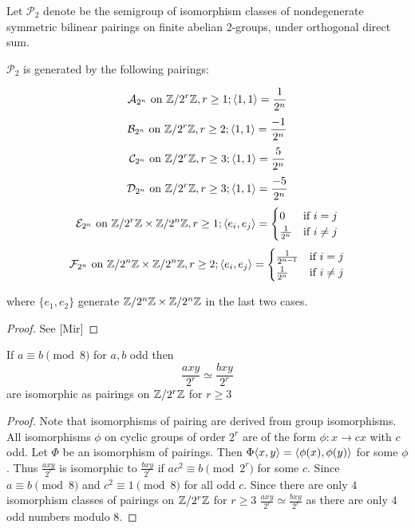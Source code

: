 \documentclass{amsart}
\begin{document}
\begin{defn}
 Let $\mathcal{P}_{2}$ denote be the semigroup of
isomorphism classes of nondegenerate symmetric bilinear pairings on
finite abelian 2-groups, under orthogonal direct sum.
\end{defn}

\begin{prop} $\mathcal{P}_{2}$ is generated by the following pairings:
  
   \[ \mathcal{A}_{2^{n}} \text{ on } \mathbb{Z}/2^{r}\mathbb{Z}, r\ge 1; \langle 1,
1\rangle=\frac{1}{2^{n}}
   \]
   \[ \mathcal{B}_{2^{n}} \text{ on } \mathbb{Z}/2^{r}\mathbb{Z}, r\ge 2; \langle 1,
1\rangle=\frac{-1}{2^{n}}
   \]
   \[ \mathcal{C}_{2^{n}} \text{ on } \mathbb{Z}/2^{r}\mathbb{Z}, r\ge 3; \langle 1,
1\rangle=\frac{5}{2^{n}}
   \]
   \[ \mathcal{D}_{2^{n}} \text{ on } \mathbb{Z}/2^{r}\mathbb{Z}, r\ge 3; \langle 1,
1\rangle=\frac{-5}{2^{n}}
   \]
   \[ \mathcal{E}_{2^{n}} \text{ on } \mathbb{Z}/2^{r}\mathbb{Z}\times\mathbb{Z}/2^{n}\mathbb{Z}, r\ge 1; \langle
e_{i}, e_{j}\rangle=\begin{cases}0&\mbox{if } i=j\\
\frac{1}{2^{n}}&\mbox{if } i\neq j\end{cases}
   \]
   \[ \mathcal{F}_{2^{n}} \text{ on } \mathbb{Z}/2^{n}\mathbb{Z}\times\mathbb{Z}/2^{n}\mathbb{Z}, r\ge 2; \langle
e_{i}, e_{j}\rangle=\begin{cases}\frac{1}{2^{n-1}}&\mbox{if } i=j\\
\frac{1}{2^{n}}&\mbox{if } i\neq j\end{cases}
   \]
   
where $\{e_{1}, e_{2}\}$ generate $\mathbb{Z}/2^{n}\mathbb{Z}\times\mathbb{Z}/2^{n}\mathbb{Z}$ in the
last two cases.
 \end{prop}
 \begin{proof} See [Mir]
 \end{proof}

\begin{lem}
 \label{lemma:2-group iso}
 If $a\equiv b\pmod 8$ for $a,b$ odd then
 \begin{equation}
  \frac{axy}{2^{r}}\simeq  \frac{bxy}{2^{r}}
 \end{equation}
  are isomorphic as pairings on $\mathbb{Z}/2^r\mathbb{Z}$ for $r\ge3$
\end{lem}
\begin{proof}
  Note that isomorphisms of pairing are derived from group
  isomorphisms. All isomorphisms $\phi$ on cyclic groups of order
  $2^{r}$ are of the form $\phi:x\to cx$ with $c$ odd. Let $\Phi$ be
  an isomorphism of pairings. Then
  $\Phi\langle x, y \rangle=\langle \phi(x), \phi(y) \rangle$ for some $\phi$. Thus
  $\frac{axy}{2^{r}}$ is isomorphic to $\frac{bxy}{2^{r}}$ if
  $ac^{2}\equiv b\pmod 2^{r}$ for some $c$. Since $a\equiv b\pmod 8$
  and $c^{2}\equiv 1\pmod 8$ for all odd $c$. Since there are only $4$
  isomorphism classes of pairings on $\mathbb{Z}/2^r\mathbb{Z}$ for $r\ge3$ %
  $\frac{axy}{2^{r}}\simeq \frac{bxy}{2^{r}}$ as there are only $4$
  odd numbers modulo $8$.
\end{proof}
\end{document}
